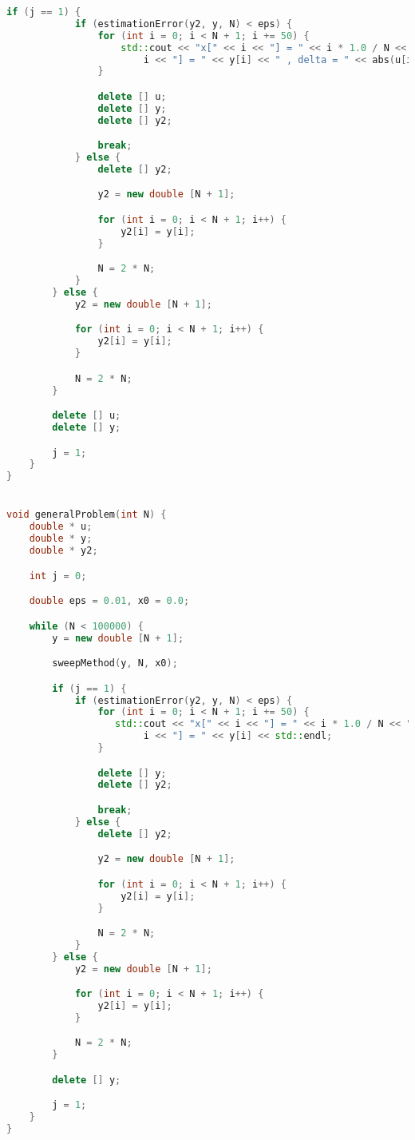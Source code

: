 \documentclass[a4paper,12pt,titlepage]{article}
\begin{document}
\begin{lstlisting}[language=C++, caption={Исходный код программы}]
        if (j == 1) {
            if (estimationError(y2, y, N) < eps) {
                for (int i = 0; i < N + 1; i += 50) {
                    std::cout << "x[" << i << "] = " << i * 1.0 / N << " , u[" << i << "] = " << u[i] << " , y[" <<
                        i << "] = " << y[i] << " , delta = " << abs(u[i] - y[i]) << std::endl;
                }

                delete [] u;
                delete [] y;
                delete [] y2;

                break;
            } else {
                delete [] y2;

                y2 = new double [N + 1];

                for (int i = 0; i < N + 1; i++) {
                    y2[i] = y[i];
                }

                N = 2 * N;
            }
        } else {
            y2 = new double [N + 1];

            for (int i = 0; i < N + 1; i++) {
                y2[i] = y[i];
            }

            N = 2 * N;
        }

        delete [] u;
        delete [] y;

        j = 1;
    }
}


void generalProblem(int N) {
    double * u;
    double * y;
    double * y2;

    int j = 0;

    double eps = 0.01, x0 = 0.0;

    while (N < 100000) {
        y = new double [N + 1];

        sweepMethod(y, N, x0);

        if (j == 1) {
            if (estimationError(y2, y, N) < eps) {
                for (int i = 0; i < N + 1; i += 50) {
                   std::cout << "x[" << i << "] = " << i * 1.0 / N << " , y[" <<
                        i << "] = " << y[i] << std::endl;
                }

                delete [] y;
                delete [] y2;

                break;
            } else {
                delete [] y2;

                y2 = new double [N + 1];

                for (int i = 0; i < N + 1; i++) {
                    y2[i] = y[i];
                }

                N = 2 * N;
            }
        } else {
            y2 = new double [N + 1];

            for (int i = 0; i < N + 1; i++) {
                y2[i] = y[i];
            }

            N = 2 * N;
        }

        delete [] y;

        j = 1;
    }
}
\end{lstlisting}
\end{document}
